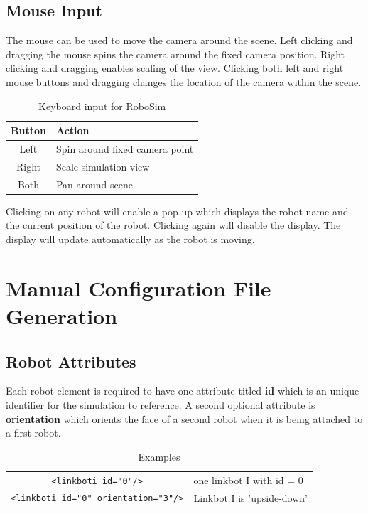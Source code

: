 \documentclass{article}
\begin{document}
\subsection{Mouse Input}
The mouse can be used to move the camera around the scene.  Left clicking and
dragging the mouse spins the camera around the fixed camera position.  Right
clicking and dragging enables scaling of the view.  Clicking both left and right
mouse buttons and dragging changes the location of the camera within the scene.
\begin{table}[H]
	\begin{center}
	\begin{tabular}{c | l }
		\hline \hline
		\textbf{Button} & \textbf{Action} \\ \hline
		Left & Spin around fixed camera point \\
		Right & Scale simulation view \\
		Both & Pan around scene \\
		\hline \hline
	\end{tabular}
	\caption{Keyboard input for RoboSim}
	\label{tab:mouse}
	\end{center}
\end{table}

Clicking on any robot will enable a pop up which displays the robot name and the
current position of the robot.  Clicking again will disable the display.  The
display will update automatically as the robot is moving.

\appendix
\section{Manual Configuration File Generation}
\subsection{Robot Attributes}
Each robot element is required to have one attribute titled \textbf{id} which is
an unique identifier for the simulation to reference.  A second optional
attribute is \textbf{orientation} which orients the face of a second robot when
it is being attached to a first robot.

\begin{table}[H]
	\begin{center}
	\begin{tabular}{c | l}
		\hline 
		\verb|<linkboti id="0"/>| & one linkbot I with id = 0 \\
		\verb|<linkboti id="0" orientation="3"/>| & Linkbot I is 'upside-down' \\
		\hline
	\end{tabular}
	\caption{Examples}
	\label{tab:ex}
	\end{center}
\end{table}
\end{document}
